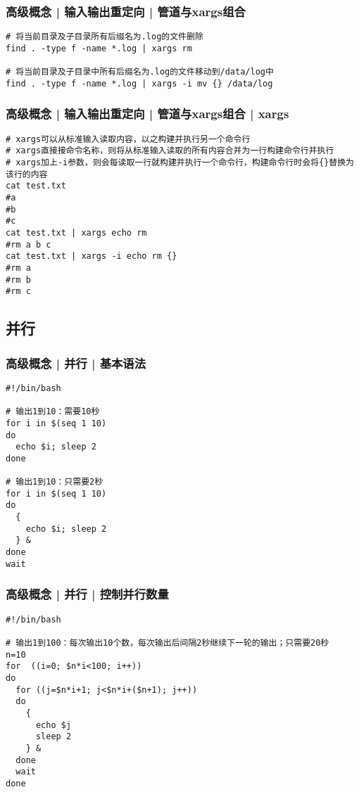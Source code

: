 \begin{frame}[fragile]
  \frametitle{高级概念 | 输入输出重定向 | 管道与xargs组合}
\begin{lstlisting}
# 将当前目录及子目录所有后缀名为.log的文件删除
find . -type f -name *.log | xargs rm

# 将当前目录及子目录中所有后缀名为.log的文件移动到/data/log中
find . -type f -name *.log | xargs -i mv {} /data/log
\end{lstlisting}
\end{frame}

\begin{frame}[fragile]
  \frametitle{高级概念 | 输入输出重定向 | 管道与xargs组合 | xargs}
  \vspace{-0.5em}
\begin{lstlisting}
# xargs可以从标准输入读取内容，以之构建并执行另一个命令行
# xargs直接接命令名称，则将从标准输入读取的所有内容合并为一行构建命令行并执行
# xargs加上-i参数，则会每读取一行就构建并执行一个命令行，构建命令行时会将{}替换为该行的内容
cat test.txt
#a
#b
#c
cat test.txt | xargs echo rm
#rm a b c
cat test.txt | xargs -i echo rm {}
#rm a
#rm b
#rm c
\end{lstlisting}
\end{frame}

\subsection{并行}
\begin{frame}[fragile]
  \frametitle{高级概念 | 并行 | 基本语法}
  \vspace{-0.5em}
\begin{lstlisting}
#!/bin/bash

# 输出1到10：需要10秒
for i in $(seq 1 10)
do
  echo $i; sleep 2
done

# 输出1到10：只需要2秒
for i in $(seq 1 10)
do
  {
    echo $i; sleep 2
  } &
done
wait
\end{lstlisting}
\end{frame}

\begin{frame}[fragile]
  \frametitle{高级概念 | 并行 | 控制并行数量}
  \vspace{-0.5em}
\begin{lstlisting}
#!/bin/bash

# 输出1到100：每次输出10个数，每次输出后间隔2秒继续下一轮的输出；只需要20秒
n=10
for  ((i=0; $n*i<100; i++))
do
  for ((j=$n*i+1; j<$n*i+($n+1); j++))
  do
    {
      echo $j
      sleep 2
    } &
  done
  wait
done
\end{lstlisting}
\end{frame}

